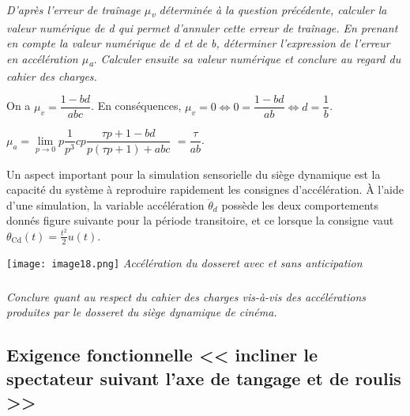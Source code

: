 \begin{multicols}{2}
\begin{corrige}
\end{corrige}
\else
\fi
  
\subparagraph{\label{q14}}\textit{D'après l'erreur de traînage $\mu$\emph{\textsubscript{v}} déterminée à
  la question précédente, calculer la valeur numérique de d qui permet
  d'annuler cette erreur de traînage. En prenant en compte la valeur
  numérique de d et de b, déterminer l'expression de l'erreur en
  accélération $\mu$\emph{\textsubscript{a}}. Calculer ensuite sa valeur
  numérique et conclure au regard du cahier des charges.}
\ifprof
\begin{corrige}
On a $\mu_v= \dfrac{1 -bd}{abc}$. En conséquences, $\mu_v=0 \Leftrightarrow  0=\dfrac{1 -bd}{ab} \Leftrightarrow d=\dfrac{1}{b}$.

$\mu_a=\lim\limits_{p\to0}  p\dfrac{1}{p^3}  cp \dfrac{\tau p + 1 -bd}{p\left(\tau p + 1 \right)+abc}$ 
$ =   \dfrac{\tau}{ab}$.

\end{corrige}
\else
\fi

\ifprof
\else

Un aspect important pour la simulation sensorielle du siège dynamique
est la capacité du système à reproduire rapidement les consignes
d'accélération. À l'aide d'une simulation, la variable accélération
\({\ddot{\theta}}_{d}\) possède les deux comportements donnés figure suivante
pour la période transitoire, et ce lorsque la consigne vaut
\(\theta_{\text{Cd}}\left( t \right) = \frac{t^{2}}{2}u(t)\).


\begin{center}
\texttt{[image: image18.png]}
\textit{Accélération du dosseret avec et sans anticipation \label{fig17}}
\end{center}
\fi

\subparagraph{}\textit{Conclure quant au respect du cahier des charges vis-à-vis des
  accélérations produites par le dosseret du siège dynamique de cinéma.}
\ifprof
\begin{corrige}
\end{corrige}
\else
\fi


\subsection*{Exigence fonctionnelle << incliner le spectateur suivant l'axe de tangage et de roulis >>}
%


\end{multicols}
